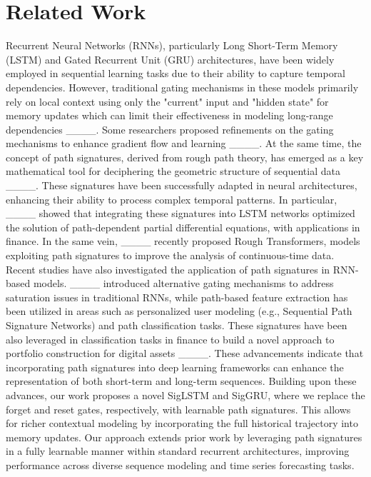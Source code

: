 \section{Related Work}
Recurrent Neural Networks (RNNs), particularly Long Short-Term Memory (LSTM) and Gated Recurrent Unit (GRU) architectures, have been widely employed in sequential learning tasks due to their ability to capture temporal dependencies. However, traditional gating mechanisms in these models primarily rely on local context using only the "current" input and "hidden state" for memory updates which can limit their effectiveness in modeling long-range dependencies ____. Some researchers proposed refinements on the gating mechanisms to enhance gradient flow and learning ____. At the same time, the concept of path signatures, derived from rough path theory, has emerged as a key mathematical tool for deciphering the geometric structure of sequential data ____. These signatures have been successfully adapted in neural architectures, enhancing their ability to process complex temporal patterns. In particular, ____ showed that integrating these signatures into LSTM networks optimized the solution of path-dependent partial differential equations, with applications in finance. In the same vein, ____ recently proposed Rough Transformers, models exploiting path signatures to improve the analysis of continuous-time data. Recent studies have also investigated the application of path signatures in RNN-based models. ____ introduced alternative gating mechanisms to address saturation issues in traditional RNNs, while path-based feature extraction has been utilized in areas such as personalized user modeling (e.g., Sequential Path Signature Networks) and path classification tasks. These signatures have been also leveraged in classification tasks in finance to build a novel approach to portfolio construction for digital assets ____. These advancements indicate that incorporating path signatures into deep learning frameworks can enhance the representation of both short-term and long-term sequences.  Building upon these advances, our work proposes a novel SigLSTM and SigGRU, where we replace the forget and reset gates, respectively, with learnable path signatures. This allows for richer contextual modeling by incorporating the full historical trajectory into memory updates. Our approach extends prior work by leveraging path signatures in a fully learnable manner within standard recurrent architectures, improving performance across diverse sequence modeling and time series forecasting tasks.